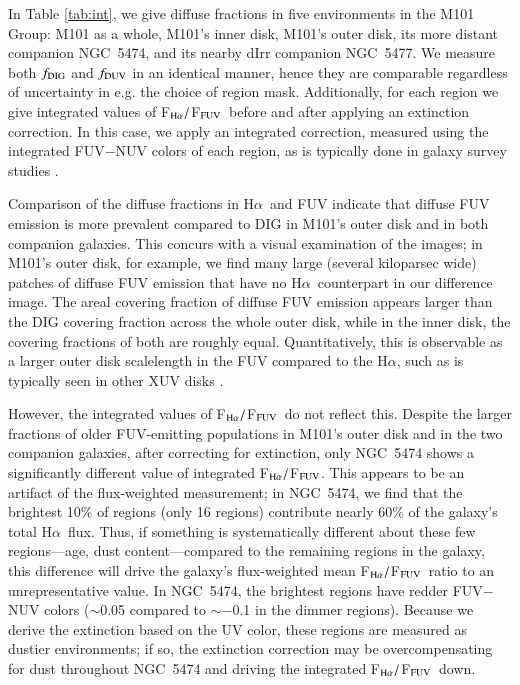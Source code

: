 \documentclass[iop]{emulateapj}
\newcommand{\ha}{H$\alpha$}
\newcommand{\hafuv}{F$_{\rm H\alpha}/$F$_{\rm FUV}$}
\begin{document}
In Table \ref{tab:int}, we give diffuse fractions in five
environments in the M101 Group: M101 as a whole, M101's inner disk,
M101's outer disk, its more distant companion NGC~5474, and its
nearby dIrr companion NGC~5477.  We measure both $f_{\rm DIG}$ and
$f_{\rm DUV}$ in an identical manner, hence they are comparable
regardless of uncertainty in e.g. the choice of  region
mask.  Additionally, for each region we give integrated values of
\hafuv \ before and after applying an extinction correction.  In this
case, we apply an integrated correction, measured using the integrated
FUV$-$NUV colors of each region, as is typically done in galaxy survey
studies \citep[e.g.,][]{lee09, meurer09}.

Comparison of the diffuse fractions in \ha \ and FUV indicate that
diffuse FUV emission is more prevalent compared to DIG in M101's outer
disk and in both companion galaxies.  This concurs with a visual
examination of the images; in M101's outer disk, for example, we find
many large (several kiloparsec wide) patches of diffuse FUV emission
that have no \ha \ counterpart in our difference image.  The areal
covering fraction of diffuse FUV emission appears larger than the DIG
covering fraction across the whole outer disk, while in the inner
disk, the covering fractions of both are roughly equal.
Quantitatively, this is observable as a larger outer disk scalelength
in the FUV compared to the \ha, such as is typically seen in other XUV
disks \citep{gildepaz05, thilker05, goddard10}.

However, the integrated values of \hafuv \ do not reflect this.
Despite the larger fractions of older FUV-emitting populations in
M101's outer disk and in the two companion galaxies, after correcting for
extinction, only NGC~5474 shows a significantly different value of
integrated \hafuv.  This appears to be an artifact of the
flux-weighted measurement; in NGC~5474, we find that the brightest
10\% of  regions (only 16 regions) contribute nearly 60\% of
the galaxy's total \ha \ flux.  Thus, if something is systematically
different about these few regions---age, dust content---compared to
the remaining  regions in the galaxy, this difference will
drive the galaxy's flux-weighted mean \hafuv \ ratio to an
unrepresentative value.  In NGC~5474, the brightest  regions
have redder FUV$-$NUV colors ($\sim$0.05 compared to $\sim -$0.1 in the
dimmer regions).  Because we derive the extinction based on the UV
color, these regions are measured as dustier environments; if so, the
extinction correction may be overcompensating for dust throughout
NGC~5474 and driving the integrated \hafuv \ down.
\end{document}
